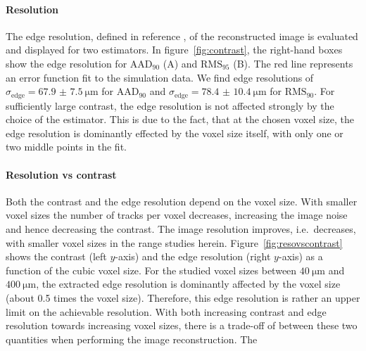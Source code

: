 \documentclass{PoS}
\newcommand{\sigmaedge}{\ensuremath{\sigma_{\textrm{edge}}}}
\newcommand{\rmsninetyfive}{\ensuremath{\textrm{RMS}_\textrm{95}}}
\newcommand{\rmsninety}{\ensuremath{\textrm{RMS}_\textrm{90}}}
\newcommand{\aadninety}{\ensuremath{\textrm{AAD}_\textrm{90}}}
\begin{document}
\paragraph{Resolution}

The edge resolution, defined in reference \cite{JansenAPL}, of the reconstructed image is evaluated and displayed for two estimators. 
In figure~\ref{fig:contrast}, the right-hand boxes show the edge resolution for $\aadninety$ (A) and $\rmsninetyfive$ (B).
The red line represents an error function fit to the simulation data. 
We find edge resolutions of $\sigmaedge = \SI{67.9(75)}{\um}$ for $\aadninety$ and $\sigmaedge = \SI{78.4(104)}{\um}$ for $\rmsninety$. 
For sufficiently large contrast, the edge resolution is not affected strongly by the choice of the estimator. 
This is due to the fact, that at the chosen voxel size, the edge resolution is dominantly effected by the voxel size itself, with only one or two middle points in the fit.  


\paragraph{Resolution vs contrast}

Both the contrast and the edge resolution depend on the voxel size. 
With smaller voxel sizes the number of tracks per voxel decreases, increasing the image noise and hence decreasing the contrast.
The image resolution improves, i.e.\ decreases, with smaller voxel sizes in the range studies herein. 
Figure~\ref{fig:resovscontrast} shows the contrast (left $y$-axis) and the edge resolution (right $y$-axis) as a function of the cubic voxel size.
For the studied voxel sizes between $\SI{40}{\um}$ and $\SI{400}{\um}$, the extracted edge resolution is dominantly affected by the voxel size (about 0.5 times the voxel size). 
Therefore, this edge resolution is rather an upper limit on the achievable resolution. 
With both increasing contrast and edge resolution towards increasing voxel sizes, there is a trade-off of between these two quantities when performing the image reconstruction. 
The
\end{document}
